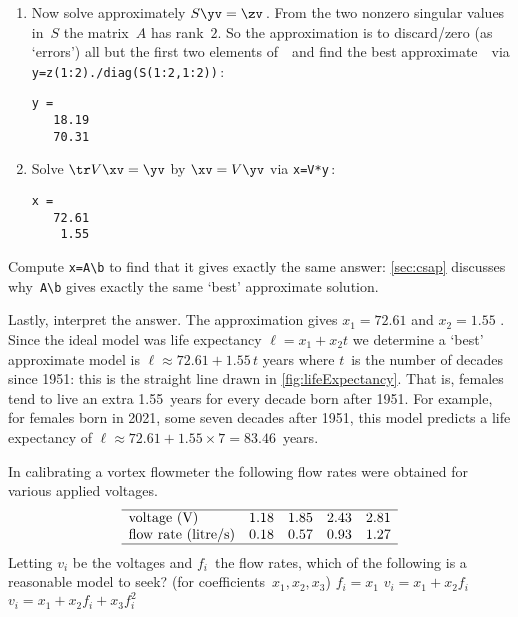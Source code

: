 \begin{example}
\begin{solution}
\begin{enumerate}
\item Now solve approximately \(S\yv=\zv\)\,. 
From the two nonzero singular values in~\(S\) the matrix~\(A\) has rank~\(2\).
So the approximation is to discard\slash zero (as `errors') all but the first two elements of~\zv\ and find the best approximate~\yv\ via \verb|y=z(1:2)./diag(S(1:2,1:2))|\,:
\begin{verbatim}
y =
   18.19
   70.31
\end{verbatim}

\item Solve \(\tr V\xv=\yv\) by \(\xv=V\yv\) via \verb|x=V*y|\,:
\begin{verbatim}
x =
   72.61
    1.55
\end{verbatim}
\end{enumerate}
Compute \verb|x=A\b| to find that it gives exactly the same answer: \cref{sec:csap} discusses why~\verb|A\b| gives exactly the same `best' approximate solution. 

Lastly, interpret the answer.
The approximation gives \(x_1=72.61\) and \(x_2=1.55\) \twodp.  
Since the ideal model was life expectancy \(\ell=x_1+x_2t\) we  determine a `best' approximate model is \(\ell\approx72.61+1.55\,t\) years where \(t\)~is the number of decades since 1951: this is the straight line drawn in \cref{fig:lifeExpectancy}.
That is, females tend to live an extra 1.55~years for every decade born after 1951.
For example, for females born in 2021, some seven decades after 1951, this model predicts a life expectancy of \(\ell\approx72.61+1.55\times7=83.46\)~years.
\end{solution}
\end{example}



\begin{activity}\label{eg:flowmeter}
In calibrating a vortex flowmeter the following flow rates were obtained for various applied voltages.
\begin{equation*}
\begin{array}{lrrrr}\hline
\text{voltage (V)}&1.18&1.85&2.43&2.81\\
\text{flow rate (litre/s)}&0.18&0.57&0.93&1.27\\\hline
\end{array}
\end{equation*}
Letting \(v_i\) be the voltages and \(f_i\)~the flow rates, which of the following is a reasonable model to seek? (for coefficients~\(x_1,x_2,x_3\))
{\(f_i=x_1\)}
{\(v_i=x_1+x_2f_i\)}
{\(v_i=x_1+x_2f_i+x_3f_i^2\)}
\end{activity}



